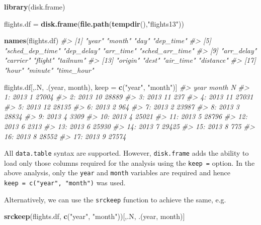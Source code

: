 \documentclass[]{book}
\newenvironment{Shaded}{\begin{snugshade}}{\end{snugshade}}
\newcommand{\CommentTok}[1]{\textcolor[rgb]{0.56,0.35,0.01}{\textit{#1}}}
\newcommand{\KeywordTok}[1]{\textcolor[rgb]{0.13,0.29,0.53}{\textbf{#1}}}
\newcommand{\NormalTok}[1]{#1}
\newcommand{\StringTok}[1]{\textcolor[rgb]{0.31,0.60,0.02}{#1}}
\begin{document}
\begin{Shaded}
\begin{Highlighting}[]
\KeywordTok{library}\NormalTok{(disk.frame)}

\NormalTok{flights.df =}\StringTok{ }\KeywordTok{disk.frame}\NormalTok{(}\KeywordTok{file.path}\NormalTok{(}\KeywordTok{tempdir}\NormalTok{(),}\StringTok{"flights13"}\NormalTok{))}

\KeywordTok{names}\NormalTok{(flights.df)}
\CommentTok{#>  [1] "year"           "month"          "day"            "dep_time"      }
\CommentTok{#>  [5] "sched_dep_time" "dep_delay"      "arr_time"       "sched_arr_time"}
\CommentTok{#>  [9] "arr_delay"      "carrier"        "flight"         "tailnum"       }
\CommentTok{#> [13] "origin"         "dest"           "air_time"       "distance"      }
\CommentTok{#> [17] "hour"           "minute"         "time_hour"}

\NormalTok{flights.df[,.N, .(year, month), keep =}\StringTok{ }\KeywordTok{c}\NormalTok{(}\StringTok{"year"}\NormalTok{, }\StringTok{"month"}\NormalTok{)]}
\CommentTok{#>     year month     N}
\CommentTok{#>  1: 2013     1 27004}
\CommentTok{#>  2: 2013    10 28889}
\CommentTok{#>  3: 2013    11   237}
\CommentTok{#>  4: 2013    11 27031}
\CommentTok{#>  5: 2013    12 28135}
\CommentTok{#>  6: 2013     2   964}
\CommentTok{#>  7: 2013     2 23987}
\CommentTok{#>  8: 2013     3 28834}
\CommentTok{#>  9: 2013     4  3309}
\CommentTok{#> 10: 2013     4 25021}
\CommentTok{#> 11: 2013     5 28796}
\CommentTok{#> 12: 2013     6  2313}
\CommentTok{#> 13: 2013     6 25930}
\CommentTok{#> 14: 2013     7 29425}
\CommentTok{#> 15: 2013     8   775}
\CommentTok{#> 16: 2013     8 28552}
\CommentTok{#> 17: 2013     9 27574}
\end{Highlighting}
\end{Shaded}

All \texttt{data.table} syntax are supported. However, \texttt{disk.frame} adds the ability to load only those columns required for the analysis using the \texttt{keep\ =} option. In the above analysis, only the \texttt{year} and \texttt{month} variables are required and hence \texttt{keep\ =\ c("year",\ "month")} was used.

Alternatively, we can use the \texttt{srckeep} function to achieve the same, e.g.

\begin{Shaded}
\begin{Highlighting}[]
\KeywordTok{srckeep}\NormalTok{(flights.df, }\KeywordTok{c}\NormalTok{(}\StringTok{"year"}\NormalTok{, }\StringTok{"month"}\NormalTok{))[,.N, .(year, month)]}
\end{Highlighting}
\end{Shaded}
\end{document}
